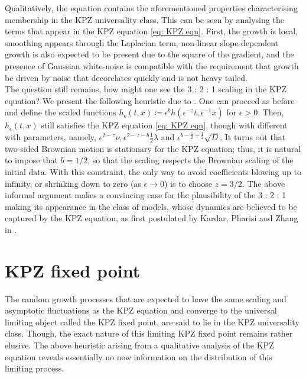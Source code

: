 \documentclass[12pt]{report}
\theoremstyle{plain}
\begin{document}
Qualitatively, the equation contains the aforementioned properties  characterising membership in the KPZ universality class. This can be seen by analysing the terms that appear in the KPZ equation \ref{eq: KPZ eqn}. First, the growth is local, smoothing appears through the Laplacian term, non-linear slope-dependent growth is also expected to be present due to the square of the gradient, and the presence of Gaussian white-noise is compatible with the requirement that growth be driven by noise that decorelates quickly and is not heavy tailed.\\

The question still remains, how might one see the 3 : 2 : 1 scaling in the KPZ equation? We present the following heuristic due to \cite{corwin2016kardar}. One can proceed as before and define the scaled functions \(h_{\epsilon}(t,x)\coloneqq  \epsilon^bh(\epsilon^{-z}t, \epsilon^{-1}x)\) for \(\epsilon > 0\). Then, \(h_{\epsilon}(t,x)\) still satisfies the KPZ equation \ref{eq: KPZ eqn}, though with different with parameters, namely, \(\epsilon^{2-z}\nu, \epsilon^{2-z-b}\frac{1}{2}\lambda\) and \(\epsilon^{b-\frac{z}{2}+\frac{1}{2}}\sqrt{D}\). It turns out that two-sided Brownian motion is stationary for the KPZ equation; thus, it is natural to impose that $b = 1/2$, so that the scaling respects the Brownian scaling of the initial data. With this constraint, the only way to avoid coefficients blowing up to infinity,
or shrinking down to zero (as \(\epsilon \to 0\)) is to
choose \(z = 3/2\). The above informal argument makes a convincing case for the plausibility of the 3 : 2 : 1 making its appearance in the class of models, whose dynamics are believed to be captured by the KPZ equation, as first postulated by Kardar, Pharisi and Zhang in \cite{kardar1986dynamic}.\\

\section{KPZ fixed point}

The random growth processes that are expected to have the same scaling and asymptotic fluctuations as the KPZ equation and converge to the universal limiting object called the KPZ fixed point, are said to lie in the KPZ universality class. Though, the exact nature of this limiting KPZ fixed point remains rather elusive. The above heuristic arising from a qualitative analysis of the KPZ equation reveals essentially no new information on the distribution of this limiting process.\\
\end{document}
